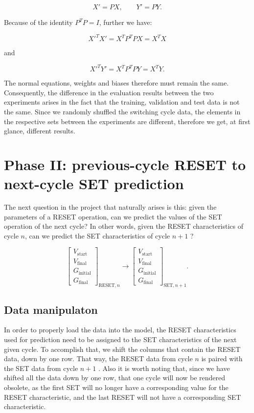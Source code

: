 \documentclass[11pt,a4paper]{article}
\begin{document}
\[
X'=PX,
\qquad
Y'=PY.
\]

Because of the identity $P^TP=I$, further we have:

\[
X'^TX'=X^TP^TPX=X^TX
\]

and

\[
X'^TY'=X^TP^TPY=X^TY.
\]

The normal equations, weights and biases therefore must remain the same. Consequently, the difference in the evaluation results between the two experiments arises in the fact that the training, validation and test data is not the same. Since we randomly shuffled the switching cycle data, the elements in the respective sets between the experiments are different, therefore we get, at first glance, different results.

\section{Phase II: previous-cycle RESET to next-cycle SET prediction}

The next question in the project that naturally arises is this: given the parameters of a RESET operation, can we predict the values of the SET operation of the next cycle? In other words, given the RESET characteristics of cycle $n$, can we predict the SET characteristics of cycle $n+1$ ?

\[
\begin{bmatrix}
V_{\mathrm{start}}\\
V_{\mathrm{final}}\\
G_{\mathrm{initial}}\\
G_{\mathrm{final}}
\end{bmatrix}_{\mathrm{RESET},n}
\longrightarrow
\begin{bmatrix}
V_{\mathrm{start}}\\
V_{\mathrm{final}}\\
G_{\mathrm{initial}}\\
G_{\mathrm{final}}
\end{bmatrix}_{\mathrm{SET},n+1}.
\]

\subsection{Data manipulaton}

In order to properly load the data into the model, the RESET characteristics used for prediction need to be assigned to the SET characteristics of the next given cycle. To accomplish that, we shift the columns that contain the RESET data, down by one row. That way, the RESET data from cycle $n$ is paired with the SET data from cycle $n+1$ . Also it is worth noting that, since we have shifted all the data down by one row, that one cycle will now be rendered obsolete, as the first SET will no longer have a corresponding value for the RESET characteristic, and the last RESET will not have a corresponding  SET characteristic.
\end{document}

